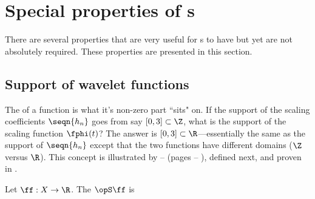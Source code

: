 \section{Special properties of s}
There are several properties that are very useful for s
to have but yet are not absolutely required.
These properties are presented in this section.

\subsection{Support of wavelet functions}
The  of a function is what it's non-zero part ``sits" on.
If the support of the scaling coefficients $\seqn{h_n}$ goes from say
$[0,3]\subset\Z$, what is the support of the scaling function $\fphi(t)$?
The answer is $[0,3]\subset\R$---essentially the same
as the support of $\seqn{h_n}$ except that the two functions have different
domains ($\Z$ versus $\R$).
This concept is illustrated by  -- 
(pages \pageref{ex:sw_gh_d1} -- \pageref{ex:sw_gh_bspline}),
defined next,
and proven in .

\begin{definition}
\label{def:support}
  Let $\ff:X\to\R$.
  The  $\opS\ff$ is
\end{definition}

